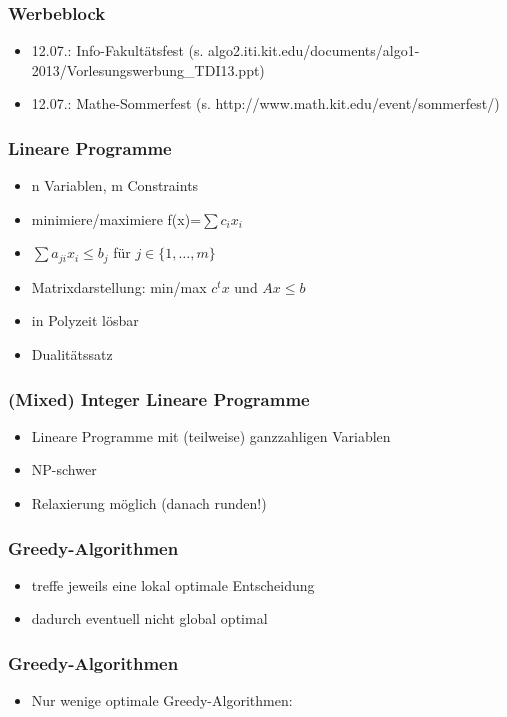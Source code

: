 

\begin{frame}
  \titlepage
\end{frame}

\begin{frame}
\frametitle{Werbeblock}
\begin{itemize}
\item 12.07.: Info-Fakultätsfest (s. algo2.iti.kit.edu/documents/algo1-2013/Vorlesungswerbung\_TDI13.ppt)
\item 12.07.: Mathe-Sommerfest (s. http://www.math.kit.edu/event/sommerfest/)
\end{itemize}
\end{frame}

\begin{frame}
\frametitle{Lineare Programme}
\begin{itemize}
\item n Variablen, m Constraints\pause
\item minimiere/maximiere f(x)=$\sum c_i x_i$
\item $\sum a_{ji} x_i \leq b_j$ für $j\in\{1,\ldots,m\}$\pause
\item Matrixdarstellung: min/max $c^t x$ und $A x\leq b$\pause
\item in Polyzeit lösbar\pause
\item Dualitätssatz
\end{itemize}
\end{frame}

\begin{frame}
\frametitle{(Mixed) Integer Lineare Programme}
\begin{itemize}
\item Lineare Programme mit (teilweise) ganzzahligen Variablen\pause
\item NP-schwer\pause
\item Relaxierung möglich (danach runden!)
\end{itemize}
\end{frame}

\begin{frame}
\frametitle{Greedy-Algorithmen}
\begin{itemize}
\item treffe jeweils eine lokal optimale Entscheidung
\item dadurch eventuell nicht global optimal
\end{itemize}
\end{frame}

\begin{frame}
\frametitle{Greedy-Algorithmen}
\begin{itemize}
\item Nur wenige optimale Greedy-Algorithmen: 
\end{itemize}
\end{frame}

